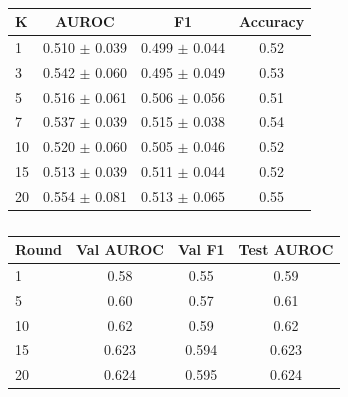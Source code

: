 \begin{table}[h]
\begin{englishblock}
\centering
\caption{}
\begin{tabular}{lccc}
\toprule
K & AUROC & F1 & Accuracy \\
\midrule
1 & 0.510 $\pm$ 0.039 & 0.499 $\pm$ 0.044 & 0.52 \\
3 & 0.542 $\pm$ 0.060 & 0.495 $\pm$ 0.049 & 0.53 \\
5 & 0.516 $\pm$ 0.061 & 0.506 $\pm$ 0.056 & 0.51 \\
7 & 0.537 $\pm$ 0.039 & 0.515 $\pm$ 0.038 & 0.54 \\
10 & 0.520 $\pm$ 0.060 & 0.505 $\pm$ 0.046 & 0.52 \\
15 & 0.513 $\pm$ 0.039 & 0.511 $\pm$ 0.044 & 0.52 \\
20 & 0.554 $\pm$ 0.081 & 0.513 $\pm$ 0.065 & 0.55 \\
\bottomrule
\end{tabular}
\label{tab:kshot_full_stats}
\end{englishblock}
\end{table}

\begin{table}[h]
\begin{englishblock}
\centering
\caption{}
\begin{tabular}{lccc}
\toprule
Round & Val AUROC & Val F1 & Test AUROC \\
\midrule
1 & 0.58 & 0.55 & 0.59 \\
5 & 0.60 & 0.57 & 0.61 \\
10 & 0.62 & 0.59 & 0.62 \\
15 & 0.623 & 0.594 & 0.623 \\
20 & 0.624 & 0.595 & 0.624 \\
\bottomrule
\end{tabular}
\label{tab:federated_rounds}
\end{englishblock}
\end{table}

